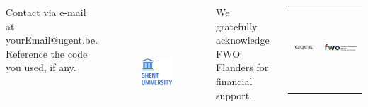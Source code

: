 \documentclass[25pt, a0paper, portrait]{tikzposter}
\begin{document}
\begin{columns}
         {
            Contact via e-mail at yourEmail@ugent.be. \\
            Reference the code you used, if any. \\
            \begin{figure}
                \vspace{-2cm}
                \begin{tikzfigure}[]
                    \includegraphics[height=5cm]{figures/ugent_logo}
                \end{tikzfigure}
            \end{figure}
            We gratefully acknowledge FWO Flanders for financial support. \\
            \begin{tabular}{l@{\hskip 1cm}c}
                \hspace{-1cm} \includegraphics[height=3cm]{figures/gqcg_logo} & \includegraphics[height=3cm]{figures/fwo_logo}
            \end{tabular}
        }


\end{columns}
\end{document}
